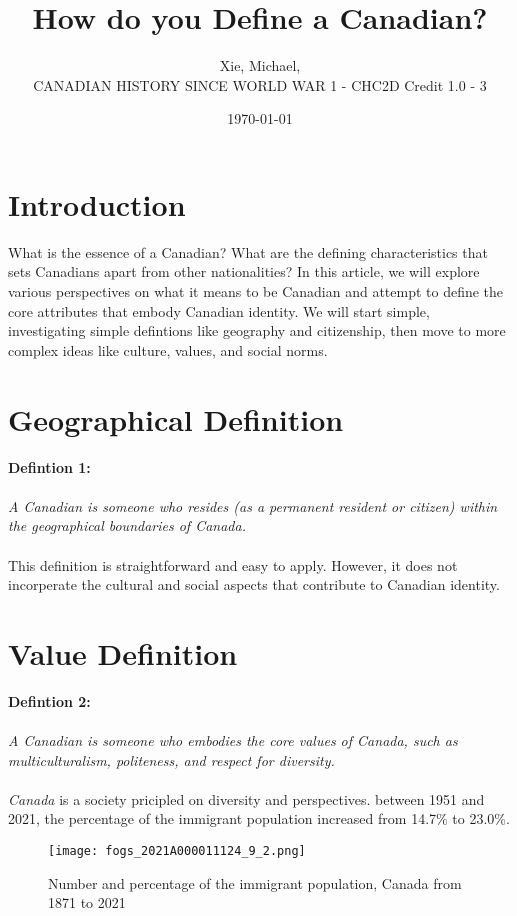 \documentclass{article}
\title{How do you Define a Canadian?}
\author{Xie, Michael,\\
CANADIAN HISTORY SINCE WORLD WAR 1 - CHC2D Credit 1.0 - 3}
\date{\today}
\begin{document}
\maketitle
\section{Introduction}
What is the essence of a Canadian? What are the defining characteristics that sets Canadians apart from other nationalities?
In this article, we will explore various perspectives on what it means to be Canadian and attempt to define the core attributes that embody Canadian identity.
We will start simple, investigating simple defintions like geography and citizenship, then move to more complex ideas like culture, values, and social norms.

\section{Geographical Definition}
\textbf{Defintion 1:} \\\\
\textit{
A Canadian is someone who resides (as a permanent resident or citizen) within the geographical boundaries of Canada.
} \\\\

This definition is straightforward and easy to apply. However, it does not incorperate the cultural and social aspects that contribute to Canadian identity.
\section{Value Definition}
\textbf{Defintion 2:} \\\\
\textit{
A Canadian is someone who embodies the core values of Canada, such as multiculturalism, politeness, and respect for diversity.
} \\\\

\textit{Canada} is a society pricipled on diversity and perspectives. between 1951 and 2021, the percentage of the immigrant population increased from 14.7\% to 23.0\%.
\begin{figure}[ht]
    \centering
    \texttt{[image: fogs\_2021A000011124\_9\_2.png]}
    \caption{Number and percentage of the immigrant population, Canada from 1871 to 2021}
\end{figure}
\end{document}
